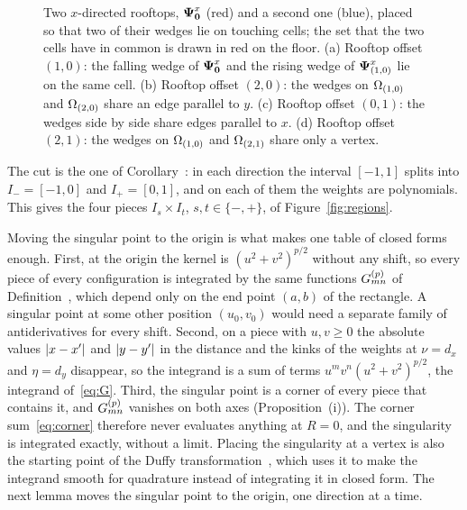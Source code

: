 \begin{figure}[ht]
    \centering
    
    \caption{Two $x$-directed rooftops, $\vb*{\Psi}^x_{\vb*{0}}$ (red) and a second one (blue), placed so that two of their
    wedges lie on touching cells; the set that the two cells have in common is drawn in red on the floor. (a) Rooftop
    offset $(1,0)$: the falling wedge of $\vb*{\Psi}^x_{\vb*{0}}$ and the rising wedge of $\vb*{\Psi}^x_{(1,0)}$ lie on the
    same cell. (b) Rooftop offset $(2,0)$: the wedges on $\Omega_{(1,0)}$ and $\Omega_{(2,0)}$ share an edge parallel to $y$.
    (c) Rooftop offset $(0,1)$: the wedges side by side share edges parallel to $x$. (d) Rooftop offset $(2,1)$: the
    wedges on $\Omega_{(1,0)}$ and $\Omega_{(2,1)}$ share only a vertex.}
    \label{fig:rooftoptouch}
\end{figure}

The cut is the one of Corollary~: in each direction the interval $[-1,1]$ splits into $I_-=[-1,0]$ and
$I_+=[0,1]$, and on each of them the weights are polynomials. This gives the four pieces $I_s\times I_t$,
$s,t\in\{-,+\}$, of Figure~\ref{fig:regions}.

Moving the singular point to the origin is what makes one table of closed forms enough. First, at the origin the
kernel is $(u^2+v^2)^{p/2}$ without any shift, so every piece of every configuration is integrated by the same functions
$G^{(p)}_{mn}$ of Definition~, which depend only on the end point $(a,b)$ of the rectangle. A
singular point at some other position $(u_0,v_0)$ would need a separate family of antiderivatives for every shift.
Second, on a piece with $u,v\ge0$ the absolute values $\left| x-x' \right|$ and $\left| y-y' \right|$ in the distance and the kinks of the
weights at $\nu=d_x$ and $\eta=d_y$ disappear, so the integrand is a sum of terms $u^mv^n(u^2+v^2)^{p/2}$, the integrand
of~\eqref{eq:G}. Third, the singular point is a corner of every piece that contains it, and $G^{(p)}_{mn}$ vanishes on
both axes (Proposition~(i)). The corner sum~\eqref{eq:corner} therefore never evaluates anything at
$R=0$, and the singularity is integrated exactly, without a limit. Placing the singularity at a vertex is also the
starting point of the Duffy transformation~\cite{duffy1982}, which uses it to make the integrand smooth for quadrature
instead of integrating it in closed form. The next lemma moves the singular point to the origin, one direction at a
time.

